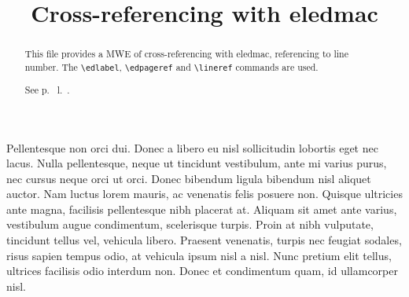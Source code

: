 \documentclass{article}
\begin{document}
\begin{english}
\title{Cross-referencing with eledmac}
\date{}
\maketitle
\begin{abstract}
This file provides a MWE of cross-referencing with eledmac, referencing to line number.
The \verb+\edlabel+, \verb+\edpageref+ and \verb+\lineref+ commands are used.

See p.~ l.~.
\end{abstract}
\end{english}

\beginnumbering

\pstart
Pellentesque non orci dui. Donec a libero eu nisl sollicitudin lobortis eget nec lacus. Nulla pellentesque, neque ut tincidunt vestibulum, ante mi varius purus, nec cursus neque orci ut orci. Donec bibendum ligula bibendum nisl aliquet auctor. Nam luctus lorem mauris, ac venenatis felis posuere non. Quisque ultricies ante magna, facilisis pellentesque nibh placerat at. Aliquam sit amet ante varius, vestibulum augue condimentum, scelerisque turpis. Proin at nibh vulputate, tincidunt tellus vel, vehicula libero. Praesent venenatis, turpis nec feugiat sodales, risus sapien tempus odio, at vehicula ipsum nisl a nisl. Nunc pretium elit tellus, ultrices facilisis odio interdum non. Donec et condimentum quam, id ullamcorper nisl.
\pend
\end{document}

